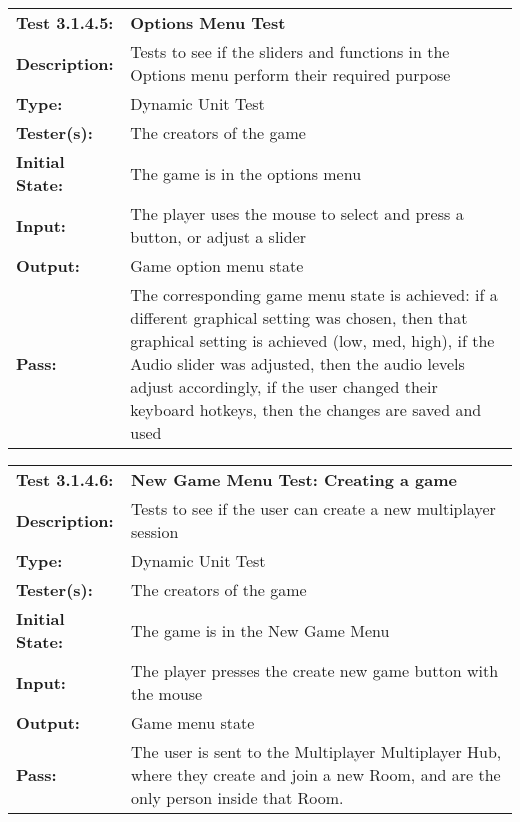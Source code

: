 \documentclass[12pt, titlepage]{article}
\begin{document}
\begin{mdframed}[linewidth=1pt]
\begin{tabularx}{\textwidth}{@{}p{3cm}X@{}}
{\bf Test 3.1.4.5:} & {\bf Options Menu Test}\\[\baselineskip]
{\bf Description:} & Tests to see if the sliders and functions in the Options menu perform their required purpose\\[0.5\baselineskip]
{\bf Type:} & Dynamic Unit Test\\[0.5\baselineskip]
{\bf Tester(s):} & The creators of the game\\[0.5\baselineskip]
{\bf Initial State:} & The game is in the options menu\\[0.5\baselineskip]
{\bf Input:} & The player uses the mouse to select and press a button, or adjust a slider \\[0.5\baselineskip]
{\bf Output:} & Game option menu state\\[0.5\baselineskip]
{\bf Pass:} & The corresponding game menu state is achieved: if a different graphical setting was chosen, then that graphical setting is achieved (low, med, high), if the Audio slider was adjusted, then the audio levels adjust accordingly, if the user changed their keyboard hotkeys, then the changes are saved and used
\end{tabularx}
\end{mdframed}

\begin{mdframed}[linewidth=1pt]
\begin{tabularx}{\textwidth}{@{}p{3cm}X@{}}
{\bf Test 3.1.4.6:} & {\bf New Game Menu Test: Creating a game}\\[\baselineskip]
{\bf Description:} & Tests to see if the user can create a new multiplayer session\\[0.5\baselineskip]
{\bf Type:} & Dynamic Unit Test\\[0.5\baselineskip]
{\bf Tester(s):} & The creators of the game\\[0.5\baselineskip]
{\bf Initial State:} & The game is in the New Game Menu\\[0.5\baselineskip]
{\bf Input:} & The player presses the create new game button with the mouse \\[0.5\baselineskip]
{\bf Output:} & Game menu state\\[0.5\baselineskip]
{\bf Pass:} & The user is sent to the Multiplayer Multiplayer Hub, where they create and join a new Room, and are the only person inside that Room.
\end{tabularx}
\end{mdframed}
\end{document}
